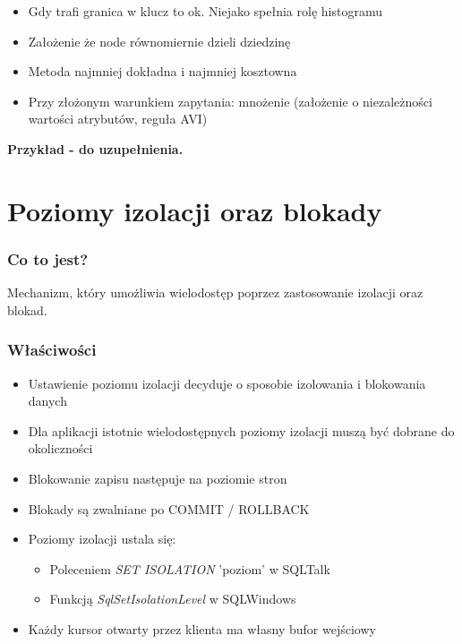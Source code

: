 \documentclass[a4paper,twoside]{article}
\begin{document}
\begin{itemize}
\begin{itemize}
  			\begin{itemize}
  				\item Gdy trafi granica w klucz to ok. Niejako spełnia rolę histogramu
  				\item Założenie że node równomiernie dzieli dziedzinę
  				\item Metoda najmniej dokładna i najmniej kosztowna
  				\item Przy złożonym warunkiem zapytania: mnożenie (założenie o niezależności wartości atrybutów, reguła AVI)
  			\end{itemize}
  			\textbf{Przykład - do uzupełnienia.}
		\end{itemize}
  	\end{itemize}
  	
  	
  	
  	\part*{Poziomy izolacji oraz blokady}
  	
  	\section*{Co to jest?}
  	Mechanizm, który umożliwia wielodostęp poprzez zastosowanie izolacji oraz blokad.
  	
  	\section*{Właściwości}
  	\begin{itemize}
  		\item Ustawienie poziomu izolacji decyduje o sposobie izolowania i blokowania danych 
  		\item Dla aplikacji istotnie wielodostępnych poziomy izolacji muszą być dobrane do okoliczności 
  		\item Blokowanie zapisu następuje na poziomie stron 
  		\item Blokady są zwalniane po COMMIT / ROLLBACK 
  		\item Poziomy izolacji ustala się:
  		\begin{itemize}
  			\item Poleceniem \emph{SET ISOLATION} 'poziom' w SQLTalk 
  			\item Funkcją \emph{SqlSetIsolationLevel} w SQLWindows
  		\end{itemize}
  		\item Każdy kursor otwarty przez klienta ma własny bufor wejściowy
  	\end{itemize}
  	
\end{document}
